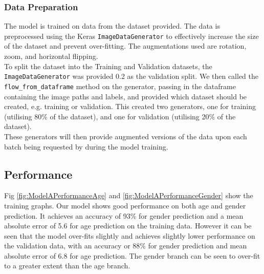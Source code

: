 \subsubsection{Data Preparation}
The model is trained on data from the dataset provided. The data is preprocessed using the Keras \verb|ImageDataGenerator| to effectively increase the size of the dataset and prevent over-fitting. 
The augmentations used are rotation, zoom, and horizontal flipping.\\
To split the dataset into the Training and Validation datasets, the \verb|ImageDataGenerator| was provided 0.2 as the validation split. We then called the \verb|flow_from_dataframe| method on the generator, passing in the dataframe containing the image paths and labels, and provided which dataset should be created, e.g. training or validation.
This created two generators, one for training (utilising 80\% of the dataset), and one for validation (utilising 20\% of the dataset).\\
These generators will then provide augmented versions of the data upon each batch being requested by during the model training.

\subsection{Performance}
Fig \autoref{fig:ModelAPerformanceAge} and \autoref{fig:ModelAPerformanceGender} show the training graphs. 
Our model shows good performance on both age and gender prediction. 
It achieves an accuracy of 93\% for gender prediction and a mean absolute error of 5.6 for age prediction on the training data. 
However it can be seen that the model over-fits slightly and achieves slightly lower performance on the validation data, with an accuracy or 88\% for gender prediction and mean absolute error of 6.8 for age prediction. 
The gender branch can be seen to over-fit to a greater extent than the age branch.


